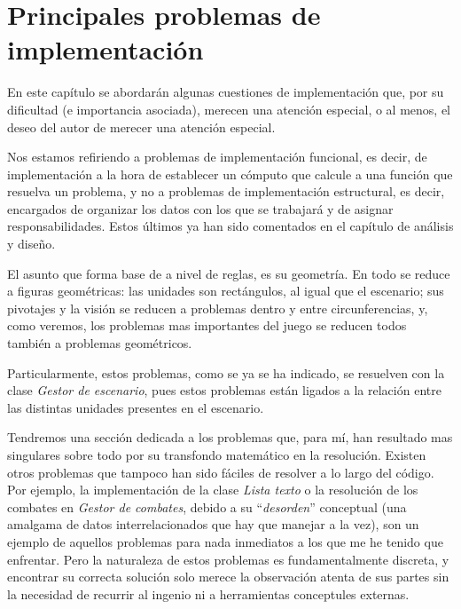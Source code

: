 %


\section{Principales problemas de implementación}
\label{sec:implementacion}

En este capítulo se abordarán algunas cuestiones de implementación
que, por su dificultad (e importancia asociada), merecen una atención
especial, o al menos, el deseo del autor de merecer una atención
especial.

Nos estamos refiriendo a problemas de implementación
funcional, es decir, de implementación a la hora de establecer un
cómputo que calcule a una función que resuelva un problema, y no a problemas de implementación
estructural, es decir, encargados de organizar los datos con los que
se trabajará y de asignar responsabilidades. Estos últimos ya han sido comentados en el capítulo de
análisis y diseño.

El asunto que forma base de \gom a nivel de reglas, es su
geometría. En \gom todo se reduce a figuras geométricas: las unidades
son rectángulos, al igual que el escenario; sus pivotajes y la visión se reducen a
problemas dentro y entre circunferencias, y, como veremos, los problemas mas importantes
del juego se reducen todos también a problemas geométricos.

Particularmente, estos problemas, como se ya se ha indicado, se resuelven
con la clase \emph{Gestor de escenario}, pues estos problemas
están ligados a la relación entre las distintas unidades presentes en
el escenario.

Tendremos una sección dedicada a los problemas que, para mí, han
resultado mas singulares sobre todo por su transfondo matemático en la
resolución. Existen otros
problemas que tampoco han sido fáciles de resolver a lo largo del
código. Por ejemplo, la
implementación de la clase \emph{Lista texto} o la resolución de los
combates en \emph{Gestor de combates}, debido a su ``\emph{desorden}''
conceptual (una amalgama de datos interrelacionados que hay que
manejar a la vez), son un ejemplo de aquellos problemas para nada
inmediatos a los que me he tenido que enfrentar. Pero la naturaleza de
estos problemas es fundamentalmente discreta, y encontrar su correcta
solución solo merece la observación atenta de sus partes sin la
necesidad de recurrir al ingenio ni a herramientas conceptules
externas.

